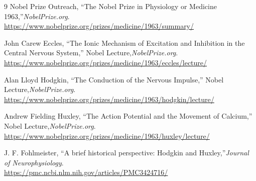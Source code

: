 \begin{thebibliography}{9}
Nobel Prize Outreach, ``The Nobel Prize in Physiology or Medicine 1963,''\emph{NobelPrize.org}.\\
\url{https://www.nobelprize.org/prizes/medicine/1963/summary/}

John Carew Eccles, ``The Ionic Mechanism of Excitation and Inhibition in the Central Nervous System,'' Nobel Lecture,\emph{NobelPrize.org}.\\
\url{https://www.nobelprize.org/prizes/medicine/1963/eccles/lecture/}

Alan Lloyd Hodgkin, ``The Conduction of the Nervous Impulse,'' Nobel Lecture,\emph{NobelPrize.org}.\\
\url{https://www.nobelprize.org/prizes/medicine/1963/hodgkin/lecture/}

Andrew Fielding Huxley, ``The Action Potential and the Movement of Calcium,'' Nobel Lecture,\emph{NobelPrize.org}.\\
\url{https://www.nobelprize.org/prizes/medicine/1963/huxley/lecture/}

J. F. Fohlmeister, ``A brief historical perspective: Hodgkin and Huxley,''\emph{Journal of Neurophysiology}.\\
\url{https://pmc.ncbi.nlm.nih.gov/articles/PMC3424716/}
\end{thebibliography}
